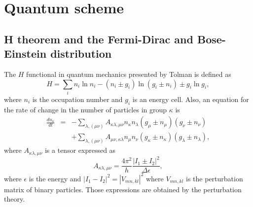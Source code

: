 \section{Quantum scheme}

\subsection{H theorem and the Fermi-Dirac and Bose-Einstein distribution}

The $H$ functional in quantum mechanics presented by Tolman \cite{bib:tolman}
is defined as
%
\begin{equation}\label{quantumh}
    H=\sum_i n_i \ln n_i -(n_i\pm g_i)\ln (g_i \pm n_i)\pm g_i\ln g_i, 
\end{equation}
%
where $n_i$ is the occupation number and $g_i$ is an energy cell. Also, an
equation for the rate of change in the number of particles in group $\kappa$ is
%
\begin{eqnarray}
    \frac{d n_{\kappa}}{dt}&=&-\sum_{\lambda,(\mu \nu)}A_{\kappa\lambda,\mu\nu} n_{\kappa}n_{\lambda}(g_{\mu}\pm n_{\mu})(g_{\nu}\pm n_{\nu})\nonumber \\
    &&+\sum_{\lambda,(\mu \nu)}A_{\mu\nu,\kappa\lambda} n_{\mu}n_{\nu}(g_{\kappa}\pm n_{\kappa})(g_{\lambda}\pm n_{\lambda}),\label{changen}
\end{eqnarray}
%
where $A_{\kappa\lambda,\mu\nu}$ is a tensor expressed as
%
\begin{equation}
  A_{\kappa\lambda,\mu\nu}=\frac{4\pi^{2}}{h}\frac{|I_1\pm I_2|^2}{\Delta \epsilon},
\end{equation}
%
where $\epsilon$ is the energy and $|I_1-I_2|^2=|V_{mn,kl}|^2$ where
$V_{mn,kl}$ is the perturbation matrix of binary particles. Those expressions
are obtained by the perturbation theory.

